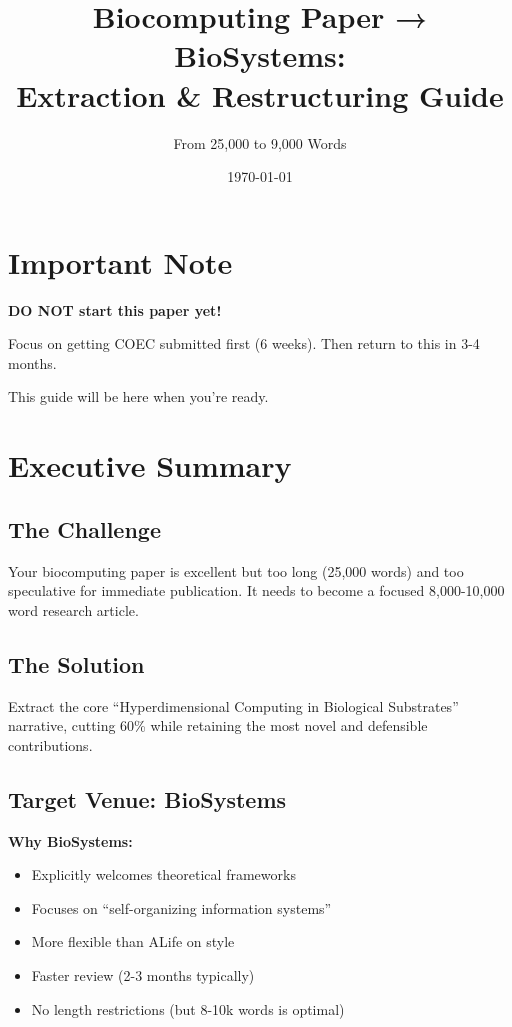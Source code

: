 \documentclass[11pt]{article}
\title{\textbf{Biocomputing Paper → BioSystems:\\Extraction \& Restructuring Guide}}
\author{From 25,000 to 9,000 Words}
\date{\today}
\begin{document}
\maketitle

\section*{Important Note}

\textcolor{cut}{\textbf{DO NOT start this paper yet!}}

Focus on getting COEC submitted first (6 weeks). Then return to this in 3-4 months.

This guide will be here when you're ready.

\section{Executive Summary}

\subsection{The Challenge}
Your biocomputing paper is excellent but too long (25,000 words) and too speculative for immediate publication. It needs to become a focused 8,000-10,000 word research article.

\subsection{The Solution}
Extract the core ``Hyperdimensional Computing in Biological Substrates'' narrative, cutting 60\% while retaining the most novel and defensible contributions.

\subsection{Target Venue: BioSystems}

\textbf{Why BioSystems:}
\begin{itemize}
    \item Explicitly welcomes theoretical frameworks
    \item Focuses on ``self-organizing information systems''
    \item More flexible than ALife on style
    \item Faster review (2-3 months typically)
    \item No length restrictions (but 8-10k words is optimal)
\end{itemize}
\end{document}
